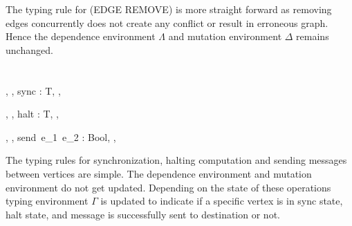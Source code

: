 \smallskip

The typing rule for (EDGE REMOVE) is more straight forward as removing edges concurrently does not create any conflict or result in erroneous graph. Hence the dependence environment $\Lambda$ and mutation environment $\Delta$ remains unchanged.\\
\ \\
\ \\         
    {\Gamma, \Lambda, \Delta \vdash sync : T, \Lambda, \Delta}
    
    {\Gamma, \Lambda, \Delta \vdash halt : T, \Lambda, \Delta}
    
    {\Gamma, \Lambda, \Delta \vdash send\ e_1\ e_2 : Bool, \Lambda, \Delta}

 \smallskip

The typing rules for synchronization, halting computation and sending messages between vertices are simple. The dependence environment and mutation environment do not get updated. Depending on the state of these operations typing environment $\Gamma$ is updated to indicate if a specific vertex is in sync state, halt state, and message is successfully sent to destination or not.\\
\ \\
\ \\    


